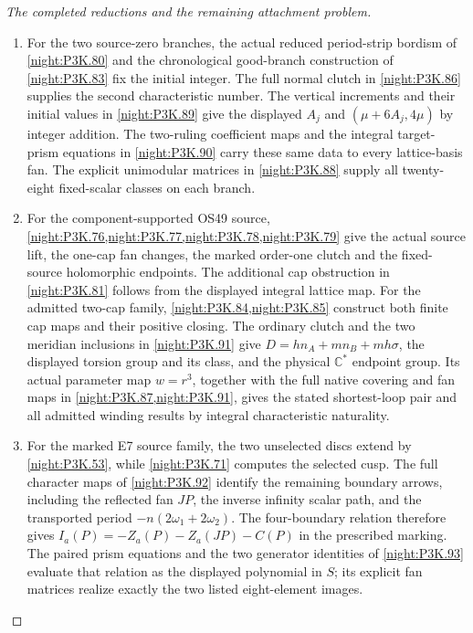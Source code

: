 \begin{proof}[The completed reductions and the remaining attachment problem]
\begin{enumerate}[label=\arabic*.]
\item For the two source-zero branches, the actual reduced period-strip
bordism of \cref{night:P3K.80} and the chronological good-branch construction
of \cref{night:P3K.83} fix the initial integer. The full normal clutch in
\cref{night:P3K.86} supplies the second characteristic number. The vertical
increments and their initial values in \cref{night:P3K.89} give the displayed
\(A_j\) and \((\mu+6A_j,4\mu)\) by integer addition. The two-ruling
coefficient maps and the integral target-prism equations in
\cref{night:P3K.90} carry these same data to every lattice-basis fan.
The explicit unimodular matrices in \cref{night:P3K.88} supply all
twenty-eight fixed-scalar classes on each branch.

\item For the component-supported OS49 source,
\cref{night:P3K.76,night:P3K.77,night:P3K.78,night:P3K.79} give the actual
source lift, the one-cap fan changes, the marked order-one clutch and
the fixed-source holomorphic endpoints. The additional cap obstruction
in \cref{night:P3K.81} follows from the displayed integral lattice map.
For the admitted two-cap family, \cref{night:P3K.84,night:P3K.85}
construct both finite cap maps and their positive closing. The ordinary
clutch and the two meridian inclusions in \cref{night:P3K.91} give
\(D=hn_A+mn_B+mh\sigma\), the displayed torsion group and its class,
and the physical \(\mathbb C^*\) endpoint group. Its actual parameter
map \(w=r^3\), together with the full native covering and fan maps in
\cref{night:P3K.87,night:P3K.91}, gives the stated shortest-loop pair
and all admitted winding results by integral characteristic naturality.

\item For the marked E7 source family, the two unselected discs extend
by \cref{night:P3K.53}, while \cref{night:P3K.71} computes the selected
cusp. The full character maps of \cref{night:P3K.92} identify the
remaining boundary arrows, including the reflected fan \(JP\), the
inverse infinity scalar path, and the transported period
\(-n(2\omega_1+2\omega_2)\). The four-boundary relation therefore gives
\(I_a(P)=-Z_a(P)-Z_a(JP)-C(P)\) in the prescribed marking.
The paired prism equations and the two generator identities of
\cref{night:P3K.93} evaluate that relation as the displayed polynomial
in \(S\); its explicit fan matrices realize exactly the two listed
eight-element images.


\end{enumerate}
\end{proof}
